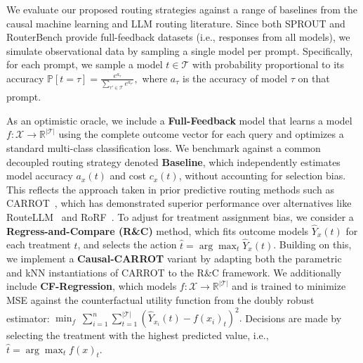 \documentclass{article}
\theoremstyle{remark}
\begin{document}


We evaluate our proposed routing strategies against a range of baselines from the causal machine learning and LLM routing literature. Since both SPROUT and RouterBench provide full-feedback datasets (i.e., responses from all models), we simulate observational data by sampling a single model per prompt. Specifically, for each prompt, we sample a model \( t \in \mathcal{T} \) with probability proportional to its accuracy $\mathbb{P}[t = \tau] = \frac{e^{a_{\tau}}}{\sum_{\tau' \in \mathcal{T}} e^{a_{\tau'}}},$ where \( a_{\tau} \) is the accuracy of model \( \tau \) on that prompt.

As an optimistic oracle, we include a \textbf{Full-Feedback} model that learns a model \( f: \mathcal{X} \to \mathbb{R}^{|\mathcal{T}|} \) using the complete outcome vector for each query and optimizes a standard multi-class classification loss. We benchmark against a common decoupled routing strategy denoted \textbf{Baseline}, which independently estimates model accuracy \( a_x(t) \) and cost \( c_x(t) \), without accounting for selection bias. This reflects the approach taken in prior predictive routing methods such as {CARROT}~\citep{somerstep2025carrot}, which has demonstrated superior performance over alternatives like RouteLLM~\citep{ong2406routellm} and RoRF~\citep{jain2023rorf}. To adjust for treatment assignment bias, we consider a \textbf{Regress-and-Compare (R\&C)} method, which fits outcome models \( \hat{Y}_x(t) \) for each treatment \( t \), and selects the action \( \hat{t} = \arg\max_{t} \hat{Y}_x(t) \). Building on this, we implement a \textbf{Causal-CARROT} variant by adapting both the parametric and kNN instantiations of CARROT to the R\&C framework. We additionally include \textbf{CF-Regression}, which models \( f: \mathcal{X} \to \mathbb{R}^{|\mathcal{T}|} \) and is trained to minimize MSE against the counterfactual utility function from the doubly robust estimator: $\min_f \ \sum_{i=1}^n \sum_{t=1}^{|\mathcal{T}|} ( \hat{Y}_{x_i}(t) - f(x_i)_t )^2.$ Decisions are made by selecting the treatment with the highest predicted value, i.e., \( \hat{t} = \arg\max_t f(x)_t \). 
\end{document}
